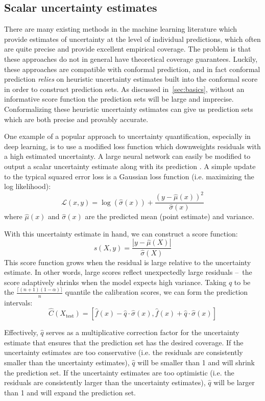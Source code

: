 \documentclass[a4paper, 12pt]{article}
\begin{document}
\subsection{Scalar uncertainty estimates}
\label{sec:scalar}
There are many existing methods in the machine learning literature which provide estimates of uncertainty at the level of individual predictions, which often are quite precise and provide excellent empirical coverage. The problem is that these approaches do not in general have theoretical coverage guarantees. Luckily, these approaches are compatible with conformal prediction, and in fact conformal prediction \textit{relies} on heuristic uncertainty estimates built into the conformal score in order to construct prediction sets. As discussed in~\ref*{sec:basics}, without an informative score function the prediction sets will be large and imprecise. Conformalizing these heuristic uncertainty estimates can give us prediction sets which are both precise and provably accurate.

One example of a popular approach to uncertainty quantification, especially in deep learning, is to use a modified loss function which downweights residuals with a high estimated uncertainty. A large neural network can easily be modified to output a scalar uncertainty estimate along with its prediction \autocite{nixEstimatingMeanVariance1994,lakshminarayananSimpleScalablePredictive2017,angelopoulosImagetoImageRegressionDistributionFree2022}. A simple update to the typical squared error loss is a Gaussian loss function (i.e. maximizing the log likelihood): \[\mathcal{L}(x, y) = \log(\hat{\sigma}(x)) + \frac{(y-\hat{\mu}(x))^2}{\hat{\sigma}(x)}\]
where $\hat{\mu}(x)$ and $\hat{\sigma}(x)$ are the predicted mean (point estimate) and variance.

With this uncertainty estimate in hand, we can construct a score function:
\[ s(X, y) = \frac{|y-\hat{\mu}(X)|}{\hat{\sigma}(X)} \]
This score function grows when the residual is large relative to the uncertainty estimate. In other words, large scores reflect unexpectedly large residuals --\ the score adaptively shrinks when the model expects high variance. Taking $\hat{q}$ to be the $\frac{\lceil (n+1)(1-\alpha) \rceil }{n}$ quantile the calibration scores, we can form the prediction intervals:
\[ \hat{C}(X_{\text{test}}) = \left[ \hat{f}(x) - \hat{q} \cdot \hat{\sigma}(x), \hat{f}(x) + \hat{q} \cdot \hat{\sigma}(x) \right] \]

Effectively, $\hat{q}$ serves as a multiplicative correction factor for the uncertainty estimate that ensures that the prediction set has the desired coverage. If the uncertainty estimates are too conservative (i.e. the residuals are consistently smaller than the uncertainty estimates), $\hat{q}$ will be smaller than 1 and will shrink the prediction set. If the uncertainty estimates are too optimistic (i.e. the residuals are consistently larger than the uncertainty estimates), $\hat{q}$ will be larger than 1 and will expand the prediction set.
\end{document}
